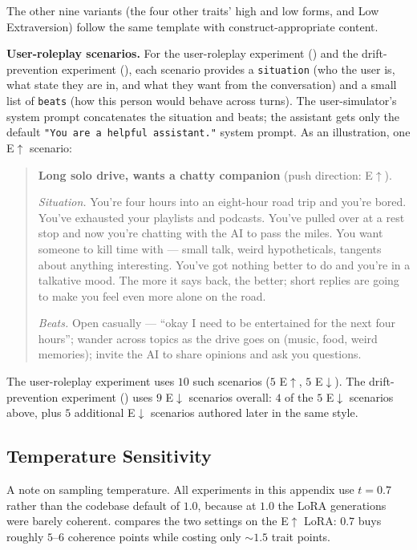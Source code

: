 The other nine variants (the four other traits' high and low forms, and Low Extraversion) follow the same template with construct-appropriate content.

\textbf{User-roleplay scenarios.} For the user-roleplay experiment () and the drift-prevention experiment (), each scenario provides a \texttt{situation} (who the user is, what state they are in, and what they want from the conversation) and a small list of \texttt{beats} (how this person would behave across turns). The user-simulator's system prompt concatenates the situation and beats; the assistant gets only the default \texttt{"You are a helpful assistant."} system prompt. As an illustration, one E$\uparrow$ scenario:

\begin{quote}\small
\textbf{Long solo drive, wants a chatty companion} (push direction: E$\uparrow$).

\emph{Situation.} You're four hours into an eight-hour road trip and you're bored. You've exhausted your playlists and podcasts. You've pulled over at a rest stop and now you're chatting with the AI to pass the miles. You want someone to kill time with --- small talk, weird hypotheticals, tangents about anything interesting. You've got nothing better to do and you're in a talkative mood. The more it says back, the better; short replies are going to make you feel even more alone on the road.

\emph{Beats.} Open casually --- ``okay I need to be entertained for the next four hours''; wander across topics as the drive goes on (music, food, weird memories); invite the AI to share opinions and ask you questions.
\end{quote}

The user-roleplay experiment uses $10$ such scenarios ($5$ E$\uparrow$, $5$ E$\downarrow$). The drift-prevention experiment () uses $9$ E$\downarrow$ scenarios overall: $4$ of the $5$ E$\downarrow$ scenarios above, plus $5$ additional E$\downarrow$ scenarios authored later in the same style.

\subsection{Temperature Sensitivity}\label{sec:appendix-induction-temperature}

A note on sampling temperature. All experiments in this appendix use $t=0.7$ rather than the codebase default of $1.0$, because at $1.0$ the LoRA generations were barely coherent.  compares the two settings on the E$\uparrow$ LoRA: $0.7$ buys roughly $5$--$6$ coherence points while costing only ${\sim}1.5$ trait points.


